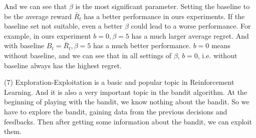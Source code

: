 And we can see that $\beta$ is the most significant parameter. Setting the baseline to be the average reward $\bar{R}_t$ has a better performance in ours experiments. If the baseline set not suitable, even a better $\beta$ could lead to a worse performance. For example, in ours experiment $b=0, \beta=5$ has a much larger average regret. And with baseline $B_t=\bar{R}_t, \beta=5$ has a much better performance. $b=0$ means without baseline, and we can see that in all settings of $\beta$, $b=0$, i.e. without baseline always has the highest regret.

(7) Exploration-Exploitation is a basic and popular topic in Reinforcement Learning. And it is also a very important topic in the bandit algorithm. At the beginning of playing with the bandit, we know nothing about the bandit. So we have to explore the bandit, gaining data from the previous decisions and feedbacks. Then after getting some information about the bandit, we can exploit them.

